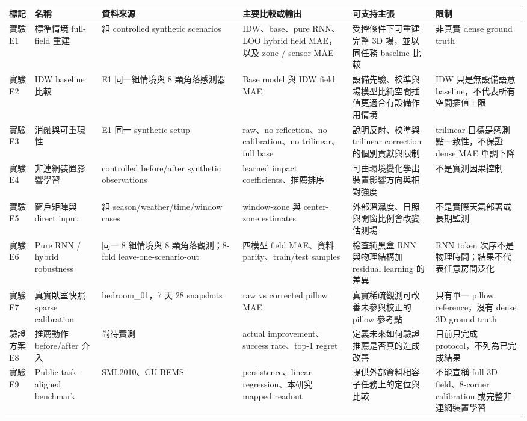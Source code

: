 \documentclass[12pt,a4paper]{article}
\begin{document}
\begin{table}[htbp]
\centering
\scriptsize
\renewcommand{\arraystretch}{1.25}
\begin{tabular}{|>{\raggedright\arraybackslash}p{}|>{\raggedright\arraybackslash}p{}|>{\raggedright\arraybackslash}p{}|>{\raggedright\arraybackslash}p{}|>{\raggedright\arraybackslash}p{}|>{\raggedright\arraybackslash}p{}|}
\hline
\textbf{標記} & \textbf{名稱} & \textbf{資料來源} & \textbf{主要比較或輸出} & \textbf{可支持主張} & \textbf{限制} \\
\hline
實驗 E1 & 標準情境 full-field 重建 & 8 組 controlled synthetic scenarios & IDW、base、pure RNN、LOO hybrid field MAE，以及 zone / sensor MAE & 受控條件下可重建完整 3D 場，並以同任務 baseline 比較 & 非真實 dense ground truth \\
\hline
實驗 E2 & IDW baseline 比較 & E1 同一組情境與 8 顆角落感測器 & Base model 與 IDW field MAE & 設備先驗、校準與場模型比純空間插值更適合有設備作用情境 & IDW 只是無設備語意 baseline，不代表所有空間插值上限 \\
\hline
實驗 E3 & 消融與可重現性 & E1 同一 synthetic setup & raw、no reflection、no calibration、no trilinear、full base & 說明反射、校準與 trilinear correction 的個別貢獻與限制 & trilinear 目標是感測點一致性，不保證 dense MAE 單調下降 \\
\hline
實驗 E4 & 非連網裝置影響學習 & controlled before/after synthetic observations & learned impact coefficients、推薦排序 & 可由環境變化學出裝置影響方向與相對強度 & 不是實測因果控制 \\
\hline
實驗 E5 & 窗戶矩陣與 direct input & 48 組 season/weather/time/window cases & window-zone 與 center-zone estimates & 外部溫濕度、日照與開窗比例會改變估測場 & 不是實際天氣部署或長期監測 \\
\hline
實驗 E6 & Pure RNN / hybrid robustness & 同一 8 組情境與 8 顆角落觀測；8-fold leave-one-scenario-out & 四模型 field MAE、資料 parity、train/test samples & 檢查純黑盒 RNN 與物理結構加 residual learning 的差異 & RNN token 次序不是物理時間；結果不代表任意房間泛化 \\
\hline
實驗 E7 & 真實臥室快照 sparse calibration & bedroom\_\allowbreak{}01，7 天 28 snapshots & raw vs corrected pillow MAE & 真實稀疏觀測可改善未參與校正的 pillow 參考點 & 只有單一 pillow reference，沒有 dense 3D ground truth \\
\hline
驗證方案 E8 & 推薦動作 before/after 介入 & 尚待實測 & actual improvement、success rate、top-1 regret & 定義未來如何驗證推薦是否真的造成改善 & 目前只完成 protocol，不列為已完成結果 \\
\hline
實驗 E9 & Public task-aligned benchmark & SML2010、CU-BEMS & persistence、linear regression、本研究 mapped readout & 提供外部資料相容子任務上的定位與比較 & 不能宣稱 full 3D field、8-corner calibration 或完整非連網裝置學習 \\
\hline
\end{tabular}
\end{table}
\end{document}
